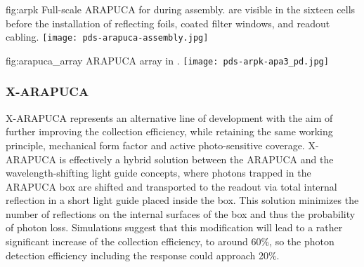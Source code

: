 
\begin{dunefigure}{fig:arpk}
{Full-scale ARAPUCA for  during assembly.  are visible in the sixteen cells before the installation of reflecting foils, coated filter windows, and readout cabling. } 
\texttt{[image: pds-arapuca-assembly.jpg]}
\end{dunefigure}

\begin{dunefigure}{fig:arapuca_array}
{ARAPUCA array in .} 	
\texttt{[image: pds-arpk-apa3\_pd.jpg]} 
\end{dunefigure}


\subsubsection{X-ARAPUCA} 
\label{sssec:x-arapuca}
X-ARAPUCA represents  an alternative line of development with the aim of further improving the collection efficiency, while retaining the same working principle, mechanical form factor and active  photo-sensitive coverage. X-ARAPUCA is effectively a hybrid solution between the ARAPUCA and the wavelength-shifting light guide concepts, where photons trapped in the ARAPUCA box are shifted and transported to the readout via total internal reflection in a short light guide placed inside the box.
This solution minimizes the number of reflections on the internal surfaces of the box and thus the probability of photon loss. Simulations suggest that this modification will lead to a rather significant increase of the collection efficiency, to around 60\%, so the photon detection efficiency including the  response could approach 20\%. 

